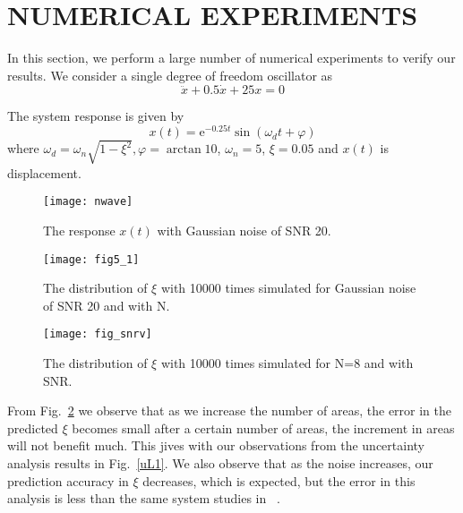 \section{NUMERICAL EXPERIMENTS}
\label{sec:results}
In this section, we perform a large number of numerical experiments to verify our results. 
We consider a single degree of freedom oscillator as
\begin{equation}
\ddot{x}+0.5 \dot{x}+25 x=0
\end{equation}

The system response is given by
\begin{equation}
x(t)=\mathrm{e}^{-0.25 t} \sin \left(\omega_{d} t+\varphi\right)
\end{equation}
where $\omega_{d}=\omega_{n} \sqrt{1-\xi^{2}}, \varphi=\arctan 10$, $\omega_{n}=5$, $\xi=0.05$ and $x(t)$ is displacement.
\begin{figure}[h]
\texttt{[image: nwave]}
\label{f4}
\centering
\caption{The response $x(t)$ with  Gaussian noise of SNR 20.}
\end{figure}
\begin{figure}[ht]
\texttt{[image: fig5\_1]}
\label{f4}
\centering
\caption{The distribution of $\xi$ with 10000 times simulated for Gaussian noise of SNR 20 and with N.}
\end{figure}

\begin{figure}[h]
\texttt{[image: fig\_snrv]}
\centering
\caption{The distribution of $\xi$ with 10000 times simulated for N=8 and with SNR.}
\end{figure}

From Fig.~\ref{f4} we observe that as we increase the number of areas, the error in the predicted $\xi$
becomes small after a certain number of areas, the increment in areas will not benefit much. 
This jives with our observations from the uncertainty analysis results in Fig.~\ref{uL1}. 
We also observe that as the noise increases, our prediction accuracy in $\xi$ decreases, which is expected, but the error in this analysis is less than the same system studies in ~\cite{Huang2007}. 